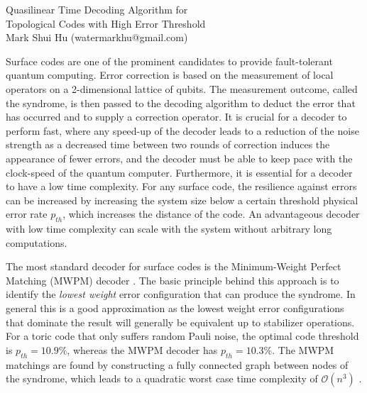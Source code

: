 \documentclass[10pt, a4paper, twoside, titlepage, usenames,dvipsnames]{report}
\begin{document}
\begingroup
    \centering
    \Large Quasilinear Time Decoding Algorithm for \\Topological Codes with High Error Threshold\\[.5em]
    \large Mark Shui Hu (watermarkhu@gmail.com)\par
\endgroup
\vspace{2em}

Surface codes \cite{dennis2002topological, kitaev2003fault} are one of the prominent candidates to provide fault-tolerant quantum computing. Error correction is based on the measurement of local operators on a 2-dimensional lattice of qubits. The measurement outcome, called the syndrome, is then passed to the decoding algorithm to deduct the error that has occurred and to supply a correction operator. It is crucial for a decoder to perform fast, where any speed-up of the decoder leads to a reduction of the noise strength as a decreased time between two rounds of correction induces the appearance of fewer errors, and the decoder must be able to keep pace with the clock-speed of the quantum computer. Furthermore, it is essential for a decoder to have a low time complexity. For any surface code, the resilience against errors can be increased by increasing the system size below a certain threshold physical error rate $p_{th}$, which increases the distance of the code. An advantageous decoder with low time complexity can scale with the system without arbitrary long computations.

The most standard decoder for surface codes is the Minimum-Weight Perfect Matching (MWPM) decoder \cite{dennis2002topological}. The basic principle behind this approach is to identify the \emph{lowest weight} error configuration that can produce the syndrome. In general this is a good approximation as the lowest weight error configurations that dominate the result will generally be equivalent up to stabilizer operations. For a toric code that only suffers random Pauli noise, the optimal code threshold is $p_{th} = 10.9\%$, whereas the MWPM decoder has $p_{th} = 10.3\%$. The MWPM matchings are found by constructing a fully connected graph between nodes of the syndrome, which leads to a quadratic worst case time complexity of $\mathcal{O}(n^3)$ \cite{kolmogorov2009blossom}.
\end{document}
